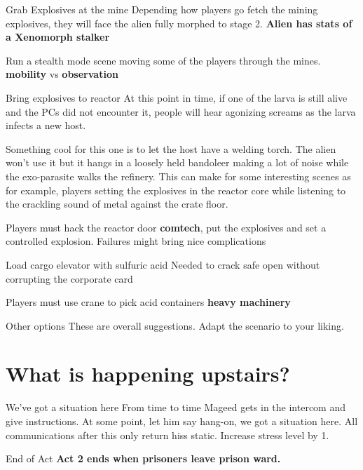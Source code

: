  \begin{rpg-commentbox}{Grab Explosives at the mine}
    Depending how players go fetch the mining explosives, they will face the alien fully morphed to stage 2. \textbf{Alien has stats of a Xenomorph stalker}

    Run a stealth mode scene moving some of the players through the mines. \textbf{mobility} vs \textbf{observation}
 \end{rpg-commentbox}


 
 \begin{rpg-commentbox}{Bring explosives to reactor}
    At this point in time, if one of the larva is still alive and the PCs did not encounter it, people will hear agonizing screams as the larva infects a new host. 

    Something cool for this one is to let the host have a welding torch. The alien won't use it but it hangs in a loosely held bandoleer making a lot of noise while the exo-parasite walks the refinery. This can make for some interesting scenes as for example, players setting the explosives in the reactor core while listening to the crackling sound of metal against the crate floor.

    Players must hack the reactor door \textbf{comtech}, put the explosives and set a controlled explosion. Failures might bring nice complications
 \end{rpg-commentbox}

 \begin{rpg-commentbox}{Load cargo elevator with sulfuric acid}
    Needed to crack safe open without corrupting the corporate card

    Players must use crane to pick acid containers \textbf{heavy machinery}
 \end{rpg-commentbox}


 \begin{rpg-commentbox}{Other options}
   These are overall suggestions. Adapt the scenario to your liking.
\end{rpg-commentbox}

 \newsect

 \section{What is happening upstairs?}
 
\begin{rpg-commentbox}{We've got a situation here}
   From time to time Mageed gets in the intercom and give instructions. At some point, let him say hang-on, we got a situation here. All communications after this only return hiss static. Increase stress level by 1.
\end{rpg-commentbox}

\begin{rpg-commentbox}{End of Act}
   \textbf{Act 2 ends when prisoners leave prison ward.}
\end{rpg-commentbox}